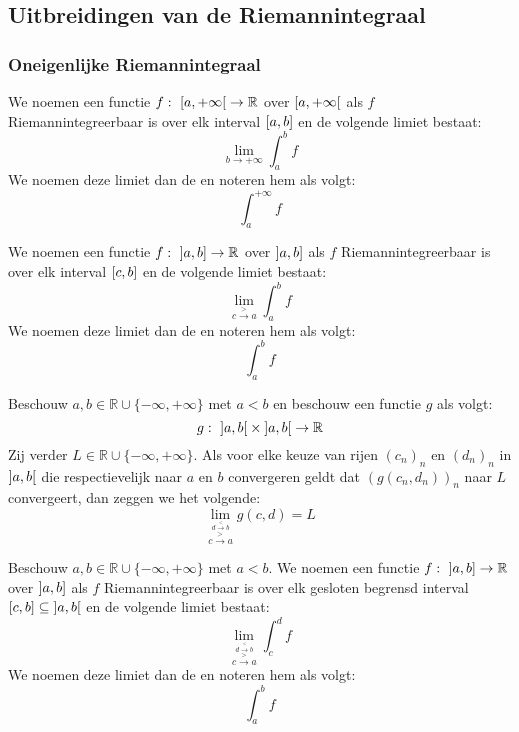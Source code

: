 \documentclass[main.tex]{subfiles}
\begin{document}
\subsection{Uitbreidingen van de Riemannintegraal}
\label{sec:uitbreidingen-van-de}

\subsubsection{Oneigenlijke Riemannintegraal}
\label{sec:oneig-riem}

\begin{de}
  We noemen een functie $f:\ \interval[open right]{a}{+\infty} \rightarrow \mathbb{R}$   over $\interval[open right]{a}{+\infty}$ als $f$ Riemannintegreerbaar is over elk interval $\interval{a}{b}$ en de volgende limiet bestaat:
  \[ \lim_{b\rightarrow +\infty}\int_{a}^{b}f \]
  We noemen deze limiet dan de  en noteren hem als volgt:
  \[ \int_{a}^{+\infty}f \]
\end{de}

\begin{de}
  We noemen een functie $f:\ \interval[open left]{a}{b} \rightarrow \mathbb{R}$   over $\interval[open left]{a}{b}$ als $f$ Riemannintegreerbaar is over elk interval $\interval{c}{b}$ en de volgende limiet bestaat:
  \[ \lim_{c\overset{>}{\rightarrow} a}\int_{a}^{b}f \]
  We noemen deze limiet dan de  en noteren hem als volgt:
  \[ \int_{a}^{b}f \]
\end{de}

\begin{de}
  Beschouw $a,b \in \mathbb{R} \cup \{ -\infty, +\infty \}$ met $a < b$ en beschouw een functie $g$ als volgt:
  \[ g:\ \interval[open]{a}{b} \times \interval[open]{a}{b} \rightarrow \mathbb{R} \]
  Zij verder $L \in \mathbb{R} \cup \{ -\infty, +\infty \}$.
  Als voor elke keuze van rijen $(c_{n})_{n}$ en $(d_{n})_{n}$ in $\interval[open]{a}{b}$ die respectievelijk naar $a$ en $b$ convergeren geldt dat $(g(c_{n},d_{n}))_{n}$ naar $L$ convergeert, dan zeggen we het volgende:
  \[ \lim_{\overset{d \overset{<}{\rightarrow} b}{c\overset{>}{\rightarrow} a}} g(c,d) = L \]
\end{de}

\begin{de}
  Beschouw $a,b\in \mathbb{R} \cup \{-\infty,+\infty\}$ met $a<b$.
  We noemen een functie $f:\ \interval[open left]{a}{b} \rightarrow \mathbb{R}$   over $\interval[open left]{a}{b}$ als $f$ Riemannintegreerbaar is over elk gesloten begrensd interval $\interval{c}{b} \subseteq \interval[open]{a}{b}$ en de volgende limiet bestaat:
  \[ \lim_{\overset{d \overset{<}{\rightarrow} b}{c\overset{>}{\rightarrow} a}}\int_{c}^{d}f \]
  We noemen deze limiet dan de  en noteren hem als volgt:
  \[ \int_{a}^{b}f \]
\end{de}
\end{document}
